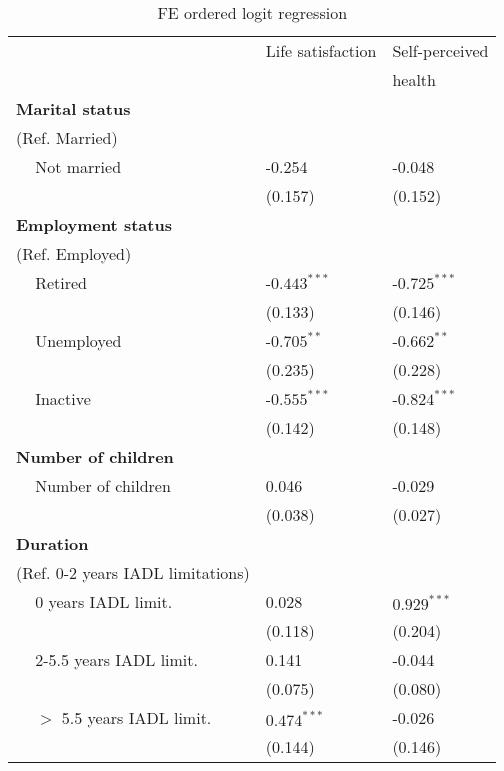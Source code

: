 \documentclass[12pt]{article}
\begin{document}
\begin{table}[htbp]
\centering
\footnotesize
\caption{FE ordered logit regression}
\label{logit}
\begin{tabular}{ll ll}
\hline
& & Life satisfaction & Self-perceived\\
& &                    &health\\\hline\hline
\multicolumn{2}{l}{\textbf{Marital status}}\\
\multicolumn{2}{l}{(Ref. Married)}\\
& Not married                           & -0.254         & -0.048           \\
&                                       &  (0.157)       &  (0.152)         \\
\multicolumn{2}{l}{\textbf{Employment status}}\\
\multicolumn{2}{l}{(Ref. Employed)}\\
&Retired                  & -$0.443^{***}$ & -$0.725^{***}$   \\
&                              &  (0.133)       &  (0.146)         \\
&Unemployed               & -$0.705^{**}$  & -$0.662^{**}$    \\
&                             &  (0.235)       &  (0.228)         \\
&Inactive                 & -$0.555^{***}$ & -$0.824^{***}$   \\
&                             &  (0.142)       &  (0.148)         \\
\multicolumn{2}{l}{\textbf{Number of children}}\\
&Number of children       &  0.046         & -0.029           \\
&                                        &  (0.038)       &  (0.027)         \\
\multicolumn{2}{l}{\textbf{Duration}}\\
\multicolumn{2}{l}{(Ref. 0-2 years IADL limitations)}\\
& 0 years IADL limit.      &  0.028         &  $0.929^{***}$   \\
&                 &  (0.118)       &  (0.204)         \\
&2-5.5 years IADL limit.  &  0.141         & -0.044           \\
&                &  (0.075)       &  (0.080)         \\
&$>$ 5.5 years IADL limit.&  $0.474^{***}$ & -0.026           \\
&               &  (0.144)       &  (0.146)         \\

\end{tabular}
\end{table}
\end{document}
